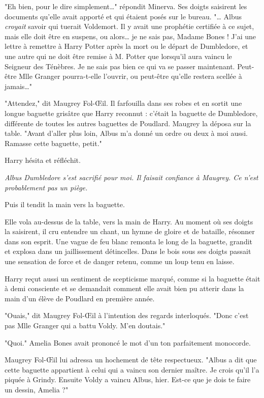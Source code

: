 "Eh bien, pour le dire simplement…" répondit Minerva. Ses doigts saisirent les documents qu'elle avait apporté et qui étaient posés sur le bureau. "… Albus \emph{croyait}  savoir qui tuerait Voldemort. Il y avait une prophétie certifiée à ce sujet, mais elle doit être en suspens, ou alors… je ne sais pas, Madame Bones ! J'ai une lettre à remettre à Harry Potter après la mort ou le départ de Dumbledore, et une autre qui ne doit être remise à M. Potter que lorsqu'il aura vaincu le Seigneur des Ténèbres. Je ne sais pas bien ce qui va se passer maintenant. Peut-être Mlle Granger pourra-t-elle l'ouvrir, ou peut-être qu'elle restera scellée à jamais…"

"Attendez," dit Maugrey Fol-Œil. Il farfouilla dans ses robes et en sortit une longue baguette grisâtre que Harry reconnut : c'était la baguette de Dumbledore, différente de toutes les autres baguettes de Poudlard. Maugrey la déposa sur la table. "Avant d'aller plus loin, Albus m'a donné un ordre ou deux à moi aussi. Ramasse cette baguette, petit."

Harry hésita et réfléchit.

\emph{Albus Dumbledore s'est sacrifié pour moi. Il faisait confiance à Maugrey. Ce n'est probablement pas un piège.} 

Puis il tendit la main vers la baguette.

Elle vola au-dessus de la table, vers la main de Harry. Au moment où ses doigts la saisirent, il cru entendre un chant, un hymne de gloire et de bataille, résonner dans son esprit. Une vague de feu blanc remonta le long de la baguette, grandit et explosa dans un jaillissement détincelles. Dans le bois sous ses doigts passait une sensation de force et de danger retenu, comme un loup tenu en laisse.

Harry reçut aussi un sentiment de scepticisme marqué, comme si la baguette était à demi consciente et se demandait comment elle avait bien pu atterir dans la main d'un élève de Poudlard en première année.

"Ouais," dit Maugrey Fol-Œil à l'intention des regards interloqués. "Donc c'est pas Mlle Granger qui a battu Voldy. M'en doutais."

"Quoi." Amelia Bones avait prononcé le mot d'un ton parfaitement monocorde.

Maugrey Fol-Œil lui adressa un hochement de tête respectueux. "Albus a dit que cette baguette appartient à celui qui a vaincu son dernier maître. Je crois qu'il l'a piquée à Grindy. Ensuite Voldy a vaincu Albus, hier. Est-ce que je dois te faire un dessin, Amelia ?"

